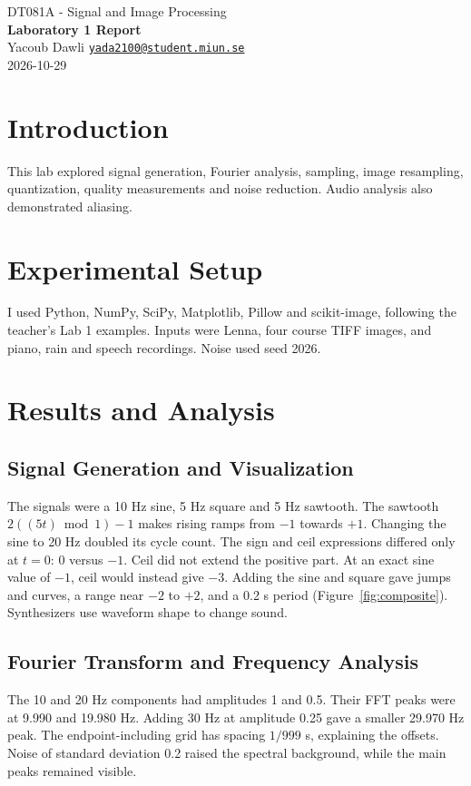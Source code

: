 \documentclass[11pt,a4paper]{article}
\begin{document}
\fontsize{10}{12}\selectfont
\begin{center}
{\large DT081A - Signal and Image Processing}\\[2pt]
{\Large\bfseries Laboratory 1 Report}\\[3pt]
Yacoub Dawli \quad \href{mailto:yada2100@student.miun.se}{\texttt{yada2100@student.miun.se}}\\[2pt]
2026-10-29
\end{center}
\vspace{-5pt}

\section{Introduction}
This lab explored signal generation, Fourier analysis, sampling, image
resampling, quantization, quality measurements and noise reduction. Audio
analysis also demonstrated aliasing.

\section{Experimental Setup}
I used Python, NumPy, SciPy, Matplotlib, Pillow and scikit-image, following the
teacher's Lab 1 examples. Inputs were Lenna, four course TIFF images, and piano,
rain and speech recordings. Noise used seed 2026.

\section{Results and Analysis}
\subsection{Signal Generation and Visualization}
The signals were a 10 Hz sine, 5 Hz square and 5 Hz sawtooth.
The sawtooth \(2((5t)\bmod 1)-1\) makes rising ramps from \(-1\) towards \(+1\).
Changing the sine to 20 Hz doubled its cycle count.
The sign and ceil expressions differed only at \(t=0\): 0 versus \(-1\).
Ceil did not extend the positive part.
At an exact sine value of \(-1\), ceil would instead give \(-3\).
Adding the sine and square gave jumps and curves, a range near \(-2\) to \(+2\),
and a 0.2 s period (Figure~\ref{fig:composite}). Synthesizers use waveform shape to change sound.

\subsection{Fourier Transform and Frequency Analysis}
The 10 and 20 Hz components had amplitudes 1 and 0.5. Their FFT peaks were at
9.990 and 19.980 Hz. Adding 30 Hz at amplitude 0.25 gave a smaller
29.970 Hz peak. The endpoint-including grid has spacing \(1/999\) s, explaining
the offsets. Noise of standard deviation 0.2 raised
the spectral background, while the main peaks remained visible.
\end{document}
